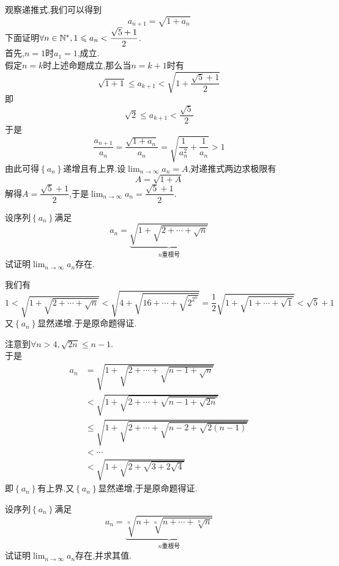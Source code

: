 \documentclass{ctexart}
\begin{document}
\begin{solution}[Proof.]
    观察递推式,我们可以得到$$a_{n+1}=\sqrt{1+a_n}$$
    下面证明$\forall n\in\mathbb{N}^*,1\leqslant{a_n}<\dfrac{\sqrt{5}+1}{2}$.\\
    首先,$n=1$时$a_1=1$,成立.\\
    假定$n=k$时上述命题成立,那么当$n=k+1$时有$$\sqrt{1+1}\leqslant a_{k+1}<\sqrt{1+\dfrac{\sqrt{5}+1}{2}}$$
    即$$\sqrt{2}\leqslant a_{k+1}<\dfrac{\sqrt{5}}{2}$$
    于是$$\dfrac{a_{n+1}}{a_n}=\dfrac{\sqrt{1+a_n}}{a_n}=\sqrt{\dfrac{1}{a_n^2}+\dfrac{1}{a_n}}>1$$
    由此可得$\left\{a_n\right\}$递增且有上界.设$\lim_{n\to\infty}a_n=A$,对递推式两边求极限有
    $$A=\sqrt{1+A}$$
    解得$A=\dfrac{\sqrt{5}+1}{2}$,于是$\displaystyle\lim_{n\to\infty}a_n=\dfrac{\sqrt{5}+1}{2}$.
\end{solution}
\begin{problem}[Problem 6.]
    设序列$\left\{a_n\right\}$满足$$a_n=\underbrace{\sqrt{1+\sqrt{2+\cdots+\sqrt{n}}}}_{n\text{重根号}}$$
    试证明$\displaystyle\lim_{n\to\infty}a_n$存在.
\end{problem}
\begin{solution}
    我们有$$1<\sqrt{1+\sqrt{2+\cdots+\sqrt{n}}}<\sqrt{4+\sqrt{16+\cdots+\sqrt{2^{2^n}}}}=\dfrac{1}{2}\sqrt{1+\sqrt{1+\cdots+\sqrt{1}}}<\sqrt{5}+1$$
    又$\left\{a_n\right\}$显然递增.于是原命题得证.
\end{solution}
\begin{solution}
    注意到$\forall n>4,\sqrt{2n}\leqslant n-1$.\\
    于是$$\begin{aligned}
        a_n
        &= \sqrt{1+\sqrt{2+\cdots+\sqrt{n-1+\sqrt{n}}}} \\
        &< \sqrt{1+\sqrt{2+\cdots+\sqrt{n-1+\sqrt{2n}}}} \\
        &\leqslant \sqrt{1+\sqrt{2+\cdots+\sqrt{n-2+\sqrt{2(n-1)}}}} \\
        &< \cdots \\
        &<\sqrt{1+\sqrt{2+\sqrt{3+2\sqrt{4}}}}
    \end{aligned}$$
    即$\left\{a_n\right\}$有上界.又$\left\{a_n\right\}$显然递增,于是原命题得证.
\end{solution}
\begin{problem}[Problem 7.]
    设序列$\left\{a_n\right\}$满足$$a_n=\underbrace{\sqrt[n]{n+\sqrt[n]{n+\cdots+\sqrt[n]{n}}}}_{n\text{重根号}}$$
    试证明$\displaystyle\lim_{n\to\infty}a_n$存在,并求其值.
\end{problem}
\end{document}
